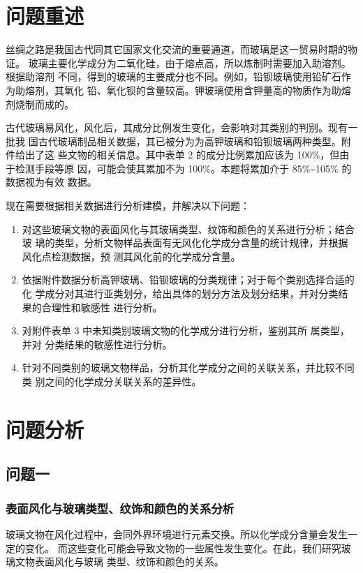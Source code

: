\documentclass[withoutpreface,bwprint]{cumcmthesis} %
\begin{document}


\section{问题重述}
丝绸之路是我国古代同其它国家文化交流的重要通道，而玻璃是这一贸易时期的物证。
玻璃主要化学成分为二氧化硅，由于熔点高，所以炼制时需要加入助溶剂。根据助溶剂
不同，得到的玻璃的主要成分也不同。例如，铅钡玻璃使用铅矿石作为助熔剂，其氧化
铅、氧化钡的含量较高。钾玻璃使用含钾量高的物质作为助熔剂烧制而成的。

古代玻璃易风化，风化后，其成分比例发生变化，会影响对其类别的判别。现有一批我
国古代玻璃制品相关数据，其已被分为为高钾玻璃和铅钡玻璃两种类型。附件给出了这
些文物的相关信息。其中表单 2 的成分比例累加应该为 100\%，但由于检测手段等原
因，可能会使其累加不为 100\%。本题将累加介于 85\%\~{}105\% 的数据视为有效
数据。

现在需要根据相关数据进行分析建模，并解决以下问题：
\begin{enumerate}
    \item 对这些玻璃文物的表面风化与其玻璃类型、纹饰和颜色的关系进行分析；结合玻
          璃的类型，分析文物样品表面有无风化化学成分含量的统计规律，并根据风化点检测数据，预
          测其风化前的化学成分含量。
    \item 依据附件数据分析高钾玻璃、铅钡玻璃的分类规律；对于每个类别选择合适的化
          学成分对其进行亚类划分，给出具体的划分方法及划分结果，并对分类结果的合理性和敏感性
          进行分析。
    \item 对附件表单 3 中未知类别玻璃文物的化学成分进行分析，鉴别其所
          属类型，并对
          分类结果的敏感性进行分析。
    \item 针对不同类别的玻璃文物样品，分析其化学成分之间的关联关系，并比较不同类
          别之间的化学成分关联关系的差异性。
\end{enumerate}

\section{问题分析}
\subsection{问题一}
\subsubsection{表面风化与玻璃类型、纹饰和颜色的关系分析}%
玻璃文物在风化过程中，会同外界环境进行元素交换。所以化学成分含量会发生一定的变化。
而这些变化可能会导致文物的一些属性发生变化。在此，我们研究玻璃文物表面风化与玻璃
类型、纹饰和颜色的关系。
\end{document}
